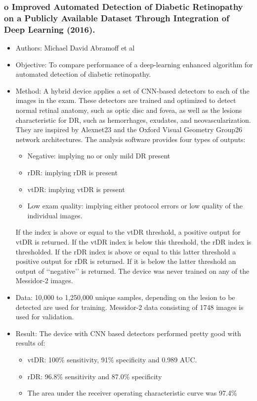 \documentclass[12pt]{report}
\begin{document}
\subsubsection{o   Improved Automated Detection of Diabetic Retinopathy on a Publicly Available Dataset Through Integration of Deep Learning (2016). \cite{abramoff2016improved}}
\begin{itemize}
\item Authors: Michael David Abramoff  et al
\item Objective: To compare performance of a deep-learning enhanced algorithm for automated detection of diabetic retinopathy.
\item Method: A hybrid device applies a set of CNN-based detectors to each of the images in the exam. These detectors are trained and optimized to detect normal retinal anatomy, such as optic disc and fovea, as well as the lesions characteristic for DR, such as hemorrhages, exudates, and neovascularization. They are inspired by Alexnet23 and the Oxford Visual Geometry Group26 network architectures. The analysis software provides four types of outputs:
\begin{itemize}
\item Negative: implying no or only mild DR present
\item rDR: implying rDR is present
\item vtDR: implying vtDR is present
\item Low exam quality: implying either protocol errors or low quality of the individual images.
\end{itemize}
If the index is above or equal to the vtDR threshold, a positive output for vtDR is returned. If the vtDR index is below this threshold, the rDR index is thresholded. If the rDR index is above or equal to this latter threshold a positive output for rDR is returned. If it is below the latter threshold an output of ‘‘negative’’ is returned. The device was never trained on any of the Messidor-2 images.
\item Data: 10,000 to 1,250,000 unique samples, depending on the lesion to be detected are used for training. Messidor-2 data consisting of 1748 images is used for validation.
\item Result: The device with CNN based detectors performed pretty good with results of:
\begin{itemize}
\item vtDR: 100\% sensitivity, 91\% specificity and 0.989 AUC.
\item rDR: 96.8\% sensitivity and 87.0\% specificity
\item The area under the receiver operating characteristic curve was 97.4\%
\end{itemize}
\end{itemize}
\end{document}

